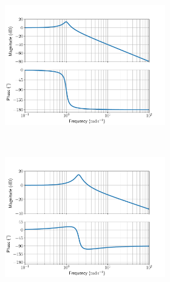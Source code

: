 \documentclass[11pt, reqno]{article}    %
\begin{document}
\begin{figure}[htbp]
    \centering
    \begin{subfigure}{0.4\textwidth}
        \centering
        \begin{subfigure}[htbp]{\textwidth} 
            \includegraphics[width=\textwidth]{figures/G1_bode.pdf} 
        \end{subfigure}\\
        \begin{subfigure}[htbp]{\textwidth} 
            \includegraphics[width=\textwidth]{figures/G2_bode.pdf} 
        \end{subfigure} \\
        \begin{subfigure}[htbp]{\textwidth} 

\end{subfigure}
\end{subfigure}
\end{figure}
\end{document}
